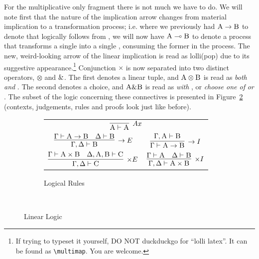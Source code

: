 For the multiplicative only fragment there is not much we have to do.
We will note first that the nature of the implication arrow changes from material implication to a transformation process; i.e. where we previously had $\prop{A} \to \prop{B}$ to denote that  logically follows from , we will now have $\prop{A} \li \prop{B}$ to denote a process that transforms a single  into a single , consuming the former in the process.
The new, weird-looking arrow of the linear implication is read as lolli(pop) due to its suggestive appearance.\footnote{If trying to typeset it yourself, DO NOT duckduckgo for ``lolli latex''. It can be found as \texttt{\textbackslash multimap}. You are welcome.}
Conjunction $\times$ is now separated into two distinct operators, $\otimes$ and $\&$. 
The first denotes a linear tuple, and $\prop{A} \otimes \prop{B}$ is read as \textit{both}  \textit{and} .
The second denotes a choice, and $\prop{A} \with \prop{B}$ is read as  \textit{with} , or \textit{choose one of}  \textit{or} .
The subset of the logic concerning these connectives is presented in Figure~\ref{figure:linear_logic_rules} (contexts, judgements, rules and proofs look just like before).


\begin{figure}
	\centering
	\begin{subfigure}{1\textwidth}
		\centering
		\begin{tabularx}{0.7\textwidth}{@{}C@{\qquad}C@{}}
		\\[1em]
		$\infer[\to E]{\Gamma, \Delta \vdash \prop B}{\Gamma \vdash \prop A \to \prop B & \Delta \vdash \prop B}$ 
		& 
		$\infer[\to I]{\Gamma \vdash \prop A \to \prop B}{\Gamma, \prop A \vdash \prop B}$\\[1em]
		$\infer[\times E]{\Gamma,\Delta \vdash \prop C}{\Gamma \vdash \prop A \times \prop B & \Delta, \prop A , \prop B \vdash \prop C}$ 
		&
		$\infer[\times I]{\Gamma, \Delta \vdash \prop A \times \prop B}{\Gamma \vdash \prop A & \Delta \vdash \prop B}$
		\end{tabularx}
		\caption{Logical Rules}
		\label{subfigure:linear_logic_rules:logical}
	\end{subfigure}\\[1em]
	\caption{Linear Logic}
	\label{figure:linear_logic_rules}
\end{figure}



